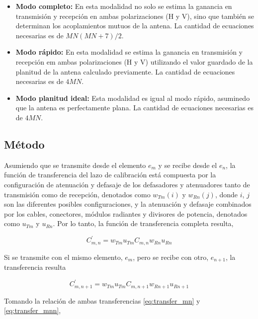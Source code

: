 \begin{itemize}
	\item \textbf{Modo completo:} En esta modalidad no solo se estima la ganancia en transmisión y recepción en ambas 
		polarizaciones (H y V), sino que también se determinan los acoplamientos mutuos de la antena. La cantidad de ecuaciones necesarias es 
		de $MN(MN + 7)/2$.
	\item \textbf{Modo rápido:} En esta modalidad se estima la ganancia en transmisión y recepción em ambas polarizaciones
		(H y V) utilizando el valor guardado de la planitud de la antena calculado previamente. La cantidad de ecuaciones necesarias
		es de $4MN$.
	\item \textbf{Modo planitud ideal:} Esta modalidad es igual al modo rápido, asuminedo que la antena es perfectamente plana. 
		La cantidad de ecuaciones necesarias es de $4MN$.
\end{itemize}




\subsection{Método}

Asumiendo que se transmite desde el elemento $e_m$ y se recibe desde el $e_n$, la función de transferencia del lazo de 
calibración está compuesta por la configuración de atenuación y defasaje de los defasadores y atenuadores tanto de 
transmisión como de recepción, denotados como $w_{Tm}(i)$ y $w_{Rn}(j)$, donde $i$, $j$ son las diferentes posibles 
configuraciones, y la atenuación y defasaje combinados por los cables, conectores, módulos radiantes y divisores de potencia,
denotados como $u_{Tm}$ y $u_{Rn}$. Por lo tanto, la función de transferencia completa resulta,

\begin{equation}
	C^{'}_{m,n} = w_{Tm} u_{Tm} C_{m,n} w_{Rn} u_{Rn}
	\label{eq:transfer_mn}
\end{equation}

Si se transmite con el mismo elemento, $e_m$, pero se recibe con otro, $e_{n + 1}$, la transferencia resulta

\begin{equation}
	C^{'}_{m,n + 1} = w_{Tm} u_{Tm} C_{m,n + 1} w_{Rn + 1} u_{Rn + 1}
	\label{eq:transfer_mnn}
\end{equation}

Tomando la relación de ambas transferencias \ref{eq:transfer_mn} y \ref{eq:transfer_mnn},

